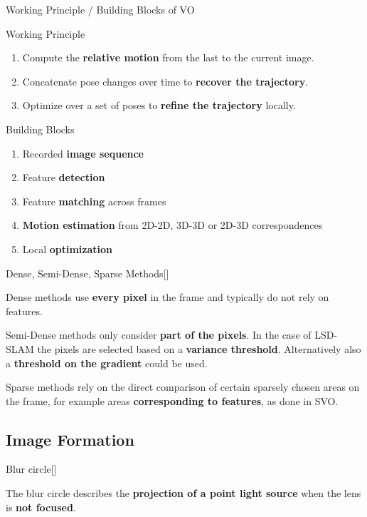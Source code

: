\documentclass[10pt,a4paper]{scrartcl}
\begin{document}
\begin{multicols*}{2}
\begin{QandA}{Working Principle / Building Blocks of VO}
\item Working Principle
\begin{enumerate}
\item Compute the \textbf{relative motion} from the last to the current image.
\item Concatenate pose changes over time to \textbf{recover the trajectory}.
\item Optimize over a set of poses to \textbf{refine the trajectory} locally.
\end{enumerate}
\item Building Blocks
\begin{enumerate}
\item Recorded \textbf{image sequence}
\item Feature \textbf{detection}
\item Feature \textbf{matching} across frames
\item \textbf{Motion estimation} from 2D-2D, 3D-3D or 2D-3D correspondences
\item Local \textbf{optimization}
\end{enumerate}
\end{QandA}

\begin{QandA}{Dense, Semi-Dense, Sparse Methods}[\Comparison]
\item Dense methods use \textbf{every pixel} in the frame and typically do not rely on features.
\item Semi-Dense methods only consider \textbf{part of the pixels}. In the case of LSD-SLAM the pixels are selected based on a \textbf{variance threshold}. Alternatively also a \textbf{threshold on the gradient} could be used.
\item Sparse methods rely on the direct comparison of certain sparsely chosen areas on the frame, for example areas \textbf{corresponding to features}, as done in SVO.
\end{QandA}

\subsection*{Image Formation}

\begin{QandA}{Blur circle}[\Definition]
\item The blur circle describes the \textbf{projection of a point light source} when the lens is \textbf{not focused}.
\end{QandA}


\end{multicols*}
\end{document}

